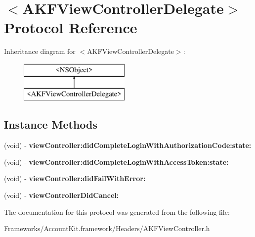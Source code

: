 \hypertarget{protocol_a_k_f_view_controller_delegate-p}{}\section{$<$A\+K\+F\+View\+Controller\+Delegate$>$ Protocol Reference}
\label{protocol_a_k_f_view_controller_delegate-p}
Inheritance diagram for $<$A\+K\+F\+View\+Controller\+Delegate$>$\+:\begin{figure}[H]
\begin{center}
\leavevmode
\includegraphics[height=2.000000cm]{protocol_a_k_f_view_controller_delegate-p}
\end{center}
\end{figure}
\subsection*{Instance Methods}
\begin{DoxyCompactItemize}
\item 
\hypertarget{protocol_a_k_f_view_controller_delegate-p_aa784dfc2bc077d59e2afd2b14665c515}{}(void) -\/ {\bfseries view\+Controller\+:did\+Complete\+Login\+With\+Authorization\+Code\+:state\+:}\label{protocol_a_k_f_view_controller_delegate-p_aa784dfc2bc077d59e2afd2b14665c515}

\item 
\hypertarget{protocol_a_k_f_view_controller_delegate-p_a5433276b374523a97775367ae0b5a0dc}{}(void) -\/ {\bfseries view\+Controller\+:did\+Complete\+Login\+With\+Access\+Token\+:state\+:}\label{protocol_a_k_f_view_controller_delegate-p_a5433276b374523a97775367ae0b5a0dc}

\item 
\hypertarget{protocol_a_k_f_view_controller_delegate-p_a3ecc79bb50ef0d0b18cd6cdbb602a6a3}{}(void) -\/ {\bfseries view\+Controller\+:did\+Fail\+With\+Error\+:}\label{protocol_a_k_f_view_controller_delegate-p_a3ecc79bb50ef0d0b18cd6cdbb602a6a3}

\item 
\hypertarget{protocol_a_k_f_view_controller_delegate-p_a4e067f2c8de1fdad3419448b3f947a2a}{}(void) -\/ {\bfseries view\+Controller\+Did\+Cancel\+:}\label{protocol_a_k_f_view_controller_delegate-p_a4e067f2c8de1fdad3419448b3f947a2a}

\end{DoxyCompactItemize}


The documentation for this protocol was generated from the following file\+:\begin{DoxyCompactItemize}
\item 
Frameworks/\+Account\+Kit.\+framework/\+Headers/A\+K\+F\+View\+Controller.\+h\end{DoxyCompactItemize}
